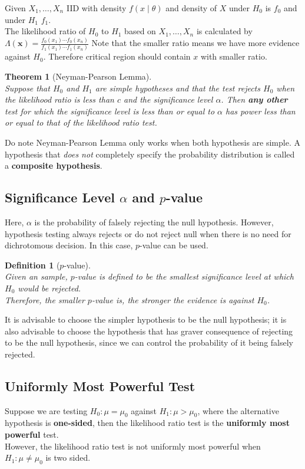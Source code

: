 \documentclass[12pt]{article}
\newtheorem{definition}{Definition}[section]
\newtheorem{theorem}{Theorem}[section]
\theoremstyle{definition}
\begin{document}
Given $X_1,\ldots, X_n$ IID with density $f(x\mid \theta)$ and density of $X$ under $H_0$ is $f_0$ and under $H_1$ $f_1$.\\
The likelihood ratio of $H_0$ to $H_1$ based on $X_1, \ldots, X_n$ is calculated by
$
\Lambda(\mathbf{x})=\frac{f_0(x_1)\cdots f_0(x_n)}{f_1(x_1)\cdots f_1(x_n)}
$
Note that the smaller ratio means we have more evidence against $H_0$. Therefore critical region should contain $x$ with smaller ratio.
\begin{theorem}[Neyman-Pearson Lemma]
\hfill\\\normalfont Suppose that $H_0$ and $H_1$ are simple hypotheses and that the test rejects $H_0$ when the likelihood ratio is less than $c$ and the significance level $\alpha$. Then \textbf{any other} test for which the significance level is less than or equal to $\alpha$ has power less than or equal to that of the likelihood ratio test.
\end{theorem}
Do note Neyman-Pearson Lemma only works when both hypothesis are simple. A hypothesis that \textit{does not} completely specify the probability distribution is called a \textbf{composite hypothesis}.
\subsection{Significance Level {$\alpha$} and {$p$}-value}
Here, $\alpha$ is the probability of falsely rejecting the null hypothesis. However, hypothesis testing always rejects or do not reject null when there is no need for dichrotomous decision. In this case, $p$-value can be used.\\
\begin{definition}[{$p$}-value]
\hfill\\\normalfont Given an sample, $p$-value is defined to be the smallest significance level at which $H_0$ would be rejected.\\
Therefore, the smaller $p$-value is, the stronger the evidence is against $H_0$.
\end{definition}
It is advisable to choose the simpler hypothesis to be the null hypothesis; it is also advisable to choose the hypothesis that has graver consequence of rejecting to be the null hypothesis, since we can control the probability of it being falsely rejected.
\subsection{Uniformly Most Powerful Test}
Suppose we are testing $H_0:\mu=\mu_0$ against $H_1:\mu>\mu_0$, where the alternative hypothesis is \textbf{one-sided}, then the likelihood ratio test is the \textbf{uniformly most powerful} test.\\
However, the likelihood ratio test is not uniformly most powerful when $H_1:\mu\neq \mu_0$ is two sided.
\end{document}
